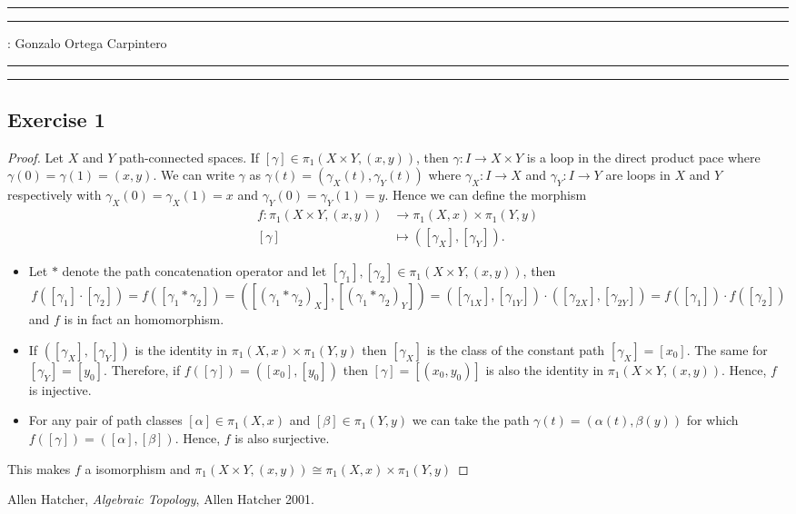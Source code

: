 \documentclass[11pt,a4paper]{article}
\begin{document}
\hrule\hrule
\vspace{1mm}


\vspace{1mm}

 : Gonzalo Ortega Carpintero
\vspace{2mm}

\hrule\hrule

\subsection*{Exercise 1}
\begin{proof}
Let $X$ and $Y$ path-connected spaces. If $[\gamma] \in \pi_1(X \times Y, (x, y)) $, then $ \gamma \colon I \to X \times Y $ is a loop in the direct product pace where $ \gamma(0) = \gamma(1) = (x,y) $. We can write $ \gamma $ as
$
  \gamma(t) = (\gamma_X(t), \gamma_Y(t))
$
where $ \gamma_X \colon I \to X $ and $ \gamma_Y \colon I \to Y $ are loops in $ X $ and $ Y $ respectively with $ \gamma_X(0) = \gamma_X(1) = x $ and $ \gamma_Y(0) = \gamma_Y(1) = y $. Hence we can define the morphism
\begin{align*}
  f \colon \pi_1(X \times Y, (x, y)) &\to \pi_1(X, x) \times \pi_1(Y,y) \\
  [\gamma] &\mapsto ([\gamma_X], [\gamma_Y]).
\end{align*}
\begin{itemize}
  \item Let $*$ denote the path concatenation operator and let $ [\gamma_1], [\gamma_2] \in \pi_1(X \times Y, (x, y)) $, then
  $$
    f([\gamma_1]\cdot[\gamma_2]) = f([\gamma_1 * \gamma_2]) = ([(\gamma_1 * \gamma_2)_X], [(\gamma_1 * \gamma_2)_Y]) = ([\gamma_{1X}], [\gamma_{1Y}]) \cdot ([\gamma_{2X}], [\gamma_{2Y}]) = f([\gamma_1]) \cdot f([\gamma_2])
  $$
  and $f$ is in fact an homomorphism.

  \item If $ ([\gamma_X], [\gamma_Y]) $ is the identity in $\pi_1(X, x) \times \pi_1(Y,y)$ then $ [\gamma_X] $ is the class of the constant path $ [\gamma_X] = [x_0]$. The same for $ [\gamma_Y] = [y_0]$. Therefore, if $ f([\gamma]) = ([x_0], [y_0]) $ then $ [\gamma] = [(x_0, y_0)] $ is also the identity in $ \pi_1(X \times Y, (x, y)) $. Hence, $ f $ is injective.
  
  \item For any pair of path classes $ [\alpha] \in \pi_1(X, x) $ and $ [\beta] \in \pi_1(Y,y) $ we can take the path $ \gamma(t) =(\alpha(t), \beta(y)) $ for which $ f([\gamma]) = ([\alpha], [\beta]) $. Hence, $ f $ is also surjective.
\end{itemize}
This makes $ f $ a isomorphism and $ \pi_1(X \times Y, (x, y)) \cong \pi_1(X, x) \times \pi_1(Y,y) $
\end{proof}



\begin{thebibliography}{9}

  Allen Hatcher,
  \textit{Algebraic Topology},
  Allen Hatcher 2001.
  
\end{thebibliography}
\end{document}
